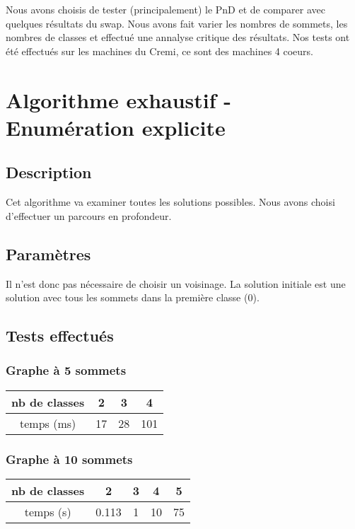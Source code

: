 \documentclass[12pt]{article}
\begin{document}
Nous avons choisis de tester (principalement) le PnD et de comparer avec quelques résultats du swap. Nous avons fait varier les nombres de sommets, les nombres de classes et effectué une annalyse critique des résultats. Nos tests ont été effectués sur les machines du Cremi, ce sont des machines 4 coeurs.

\newpage

\section{Algorithme exhaustif - Enumération explicite}
\subsection{Description}
Cet algorithme va examiner toutes les solutions possibles. Nous avons choisi d'effectuer un parcours en profondeur.

\subsection{Paramètres}
Il n’est donc pas nécessaire de choisir un voisinage. La solution initiale est une solution avec tous les sommets dans la première classe (0).

\subsection{Tests effectués}

\subsubsection{Graphe à 5 sommets}

\begin{tabular}{|c|c|c|c|}
	\hline 
	nb de classes & 2 & 3 & 4 \\
	\hline
	temps (ms) & 17 & 28 & 101 \\
	\hline
\end{tabular}

\subsubsection{Graphe à 10 sommets}

\begin{tabular}{|c|c|c|c|c|}
	\hline 
	nb de classes & 2 & 3 & 4 & 5 \\
	\hline
	temps (s) & 0.113 & 1 & 10 & 75 \\
	\hline
\end{tabular}
\end{document}
